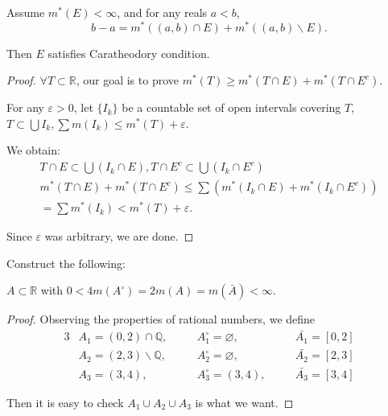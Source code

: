 \begin{problem}
Assume $ m^{*}(E)<\infty $, and for any reals $ a<b $,
\[
	b-a=m^{*}((a,b)\cap E)+m^{*}((a,b)\backslash E).
\]

Then $ E $ satisfies Caratheodory condition.
\end{problem}

\begin{proof}
	$ \forall T \subset \mathbb{R} $, our goal is to prove $
		m^*( T ) \ge m^*( T\cap E ) +m^*( T\cap E^c )
	$.

	For any $ \varepsilon>0 $,
	let $ \{I_{k}\} $ be a countable set of open intervals covering $ T $,
	$ T\subset \bigcup I_{k},\sum{m( I_k ) \le m^*( T ) +\varepsilon} $.

	We obtain:
	\begin{gather*}
		T\cap E\subset \bigcup (I_{k}\cap E ),T\cap E^{c}\subset \bigcup (I_{k}\cap E^{c} ) \\
		m^*( T\cap E ) +m^*( T\cap E^c )
		\le \sum{( m^*( I_k\cap E ) +m^*( I_k\cap E^c ) )} \\
		=\sum{m^*( I_k )}
		<m^*( T )+\varepsilon.
	\end{gather*}

	Since $ \varepsilon $ was arbitrary, we are done.
\end{proof}

Construct the following:

\begin{problem}
$ A\subset \mathbb{R}  $ with $ 0<4m(A^{\circ})=2m(A)=m(\bar{A})<\infty $.
\end{problem}

\begin{proof}
	Observing the properties of rational numbers, we define
	\begin{alignat*}{3}
		      & A_1=( 0,2 ) \cap \mathbb{Q},
		\quad &                                               & A_1^{\circ}=\varnothing ,
		\quad &                                               & \bar{A_1}=[ 0,2 ]     \\
		      & A_2=( 2,3 ) \backslash \mathbb{Q},
		\quad &                                               & A_2^{\circ}=\varnothing ,
		\quad &                                               & \bar{A_2}=[ 2,3 ]     \\
		      & A_3=( 3,4 ) ,
		\quad &                                               & A_3^{\circ}=( 3,4 ) ,
		\quad &                                               & \bar{A_3}=[ 3,4 ]
	\end{alignat*}

	Then it is easy to check $
		A_1\cup A_2\cup A_3
	$ is what we want.
\end{proof}

